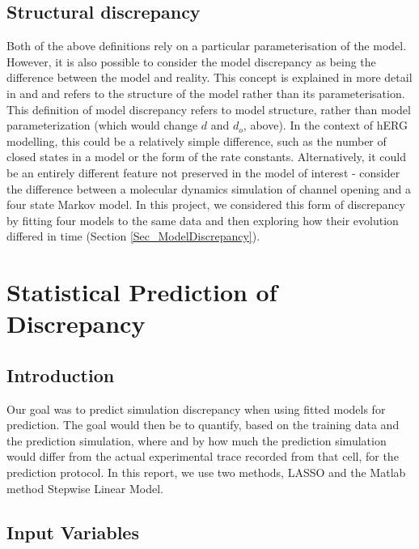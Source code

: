 \documentclass[11pt,a4paper,oneside]{article}
\begin{document}
\subsection{Structural discrepancy}
Both of the above definitions rely on a particular parameterisation of the model. However, it is also possible to consider the model discrepancy as being the difference between the model and reality. This concept is explained in more detail in \cite{Kennedy2002} and \cite{Strong2014} and refers to the structure of the model rather than its parameterisation.  This definition of model discrepancy refers to model structure, rather than model parameterization (which would change $d$ and $d_o$, above). In the context of hERG modelling, this could be a relatively simple difference, such as the number of closed states in a model or the form of the rate constants. Alternatively, it could be an entirely different feature not preserved in the model of interest - consider the difference between a molecular dynamics simulation of channel opening and a four state Markov model. In this project, we considered this form of discrepancy by fitting four models to the same data and then exploring how their evolution differed in time (Section \ref{Sec_ModelDiscrepancy}).

\section{Statistical Prediction of Discrepancy}

\subsection{Introduction}

Our goal was to predict simulation discrepancy when using fitted models for prediction. The goal would then be to quantify, based on the training data and the prediction simulation, where and by how much the prediction simulation would differ from the actual experimental trace recorded from that cell, for the prediction protocol. In this report, we use two methods, LASSO and the Matlab method Stepwise Linear Model.

\subsection{Input Variables}\label{SubSec_Predictors}
\end{document}
